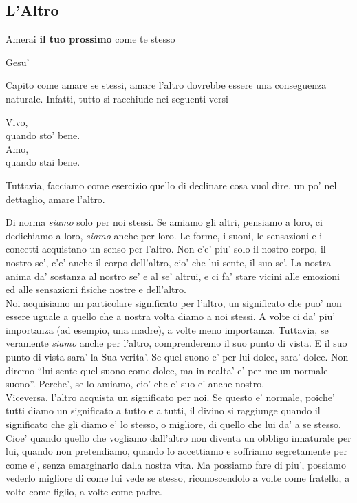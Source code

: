 \subsection{L'Altro}
\label{altrui}
\epigraph{
    Amerai \textbf{il tuo prossimo} come te stesso
 }{Gesu'}

Capito come amare se stessi, amare l'altro dovrebbe essere una conseguenza naturale. Infatti, tutto si racchiude nei seguenti versi

\begin{poem}
    Vivo,\\
    quando sto' bene.\\
    Amo,\\
    quando stai bene.\\
\end{poem}

Tuttavia, facciamo come esercizio quello di declinare cosa vuol dire, un po' nel dettaglio, amare l'altro.

Di norma \emph{siamo} solo per noi stessi. Se amiamo gli altri, pensiamo a loro, ci dedichiamo a loro, \emph{siamo} anche per loro. Le forme, i suoni, le sensazioni e i concetti acquistano un senso per l'altro. Non c'e' piu' solo il nostro corpo, il nostro se', c'e' anche il corpo dell'altro, cio' che lui sente, il suo se'. La nostra anima da' sostanza al nostro se' e al se' altrui, e ci fa' stare vicini alle emozioni ed alle sensazioni fisiche nostre e dell'altro. \\
Noi acquisiamo un particolare significato per l'altro, un significato che puo' non essere uguale a quello che a nostra volta diamo a noi stessi. A volte ci da' piu' importanza (ad esempio, una madre), a volte meno importanza. Tuttavia, se veramente \emph{siamo} anche per l'altro, comprenderemo il suo punto di vista. E il suo punto di vista sara' la Sua verita'. Se quel suono e' per lui dolce, sara' dolce. Non diremo ``lui sente quel suono come dolce, ma in realta' e' per me un normale suono''. Perche', se lo amiamo, cio' che e' suo e' anche nostro.\\
Viceversa, l'altro acquista un significato per noi. Se questo e' normale, poiche' tutti diamo un significato a tutto e a tutti, il divino si raggiunge quando il significato che gli diamo e' lo stesso, o migliore, di quello che lui da' a se stesso. Cioe' quando quello che vogliamo dall'altro non diventa un obbligo innaturale per lui, quando non pretendiamo, quando lo accettiamo e soffriamo segretamente per come e', senza emarginarlo dalla nostra vita. Ma possiamo fare di piu', possiamo vederlo migliore di come lui vede se stesso, riconoscendolo a volte come fratello, a volte come figlio, a volte come padre.

